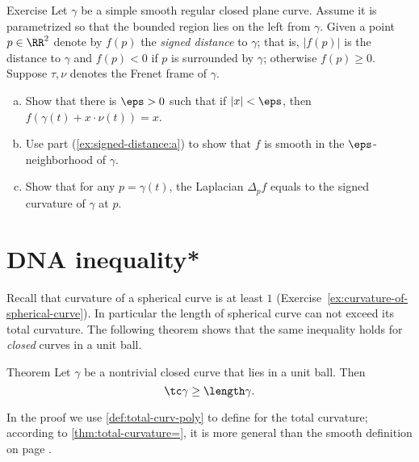 \begin{thm}{Exercise}\label{ex:signed-distance}
Let $\gamma$ be a simple smooth regular closed plane curve.
Assume it is parametrized so that the bounded region lies on the left from $\gamma$.
Given a point $p\in\RR^2$ denote by $f(p)$ the \emph{signed distance} to $\gamma$;
that is, $|f(p)|$ is the distance to $\gamma$ and $f(p)<0$ if $p$ is surrounded by $\gamma$; otherwise $f(p)\ge0$.
Suppose $\tau,\nu$ denotes the Frenet frame of $\gamma$.

\begin{enumerate}[(a)]
\item\label{ex:signed-distance:a} Show that there is $\eps>0$ such that if $|x|<\eps$, then $f(\gamma(t)+x\cdot \nu(t))=x$.
\item Use part (\ref{ex:signed-distance:a}) to show that $f$ is smooth in the $\eps$-neighborhood of $\gamma$. 
\item Show that for any $p=\gamma(t)$, the Laplacian $\Delta_p f$ equals to the signed curvature of $\gamma$ at $p$.
\end{enumerate}

\end{thm}















\section*{DNA inequality*}

Recall that curvature of a spherical curve is at least $1$
(Exercise~\ref{ex:curvature-of-spherical-curve}).
In particular the length of spherical curve can not exceed its total curvature.
The following theorem shows that the same inequality holds for \emph{closed} curves in a unit ball.

\begin{thm}{Theorem}\label{thm:DNA}
Let $\gamma$ be a nontrivial closed curve that lies in a unit ball.
Then 
\[\tc\gamma\ge \length\gamma.\]

\end{thm}

In the proof we use \ref{def:total-curv-poly} to define for the total curvature;
according to \ref{thm:total-curvature=}, it is more general than the smooth definition on page \pageref{page:total curvature of:smooth-def}.

